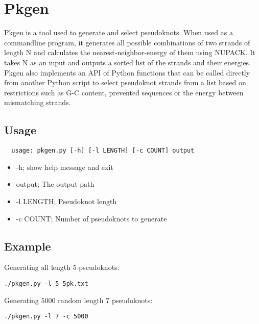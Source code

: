 \section{Pkgen}
Pkgen is a tool used to generate and select pseudoknots. When used as a commandline program, it generates all possible combinations of two strands of length N and calculates the nearest-neighbor-energy of them using NUPACK. It takes N as an input and outputs a sorted list of the strands and their energies. Pkgen also implements an API of Python functions that can be called directly from another Python script to select pseudoknot strands from a list based on restrictions such as G-C content, prevented sequences or the energy between mismatching strands.
\subsection{Usage}
\begin{verbatim}
  usage: pkgen.py [-h] [-l LENGTH] [-c COUNT] output
\end{verbatim}
\begin{itemize}
  \item -h; show help message and exit
  \item output; The output path
  \item -l LENGTH; Pseudoknot length
  \item -c COUNT; Number of pseudoknots to generate
\end{itemize}

\subsection{Example}
Generating all length 5-pseudoknots:
\begin{verbatim}
./pkgen.py -l 5 5pk.txt
\end{verbatim}
Generating 5000 random length 7 pseudoknots:
\begin{verbatim}
./pkgen.py -l 7 -c 5000
\end{verbatim}
